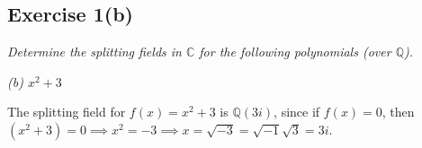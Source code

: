 \subsection*{Exercise 1(b)}
\textit{Determine the splitting fields in $\mathbb{C}$ for the following polynomials (over $\mathbb{Q}$).}

\textit{(b) $x^2 + 3$}

\vspace{5 mm}
The splitting field for $f(x) = x^2 + 3$ is $\mathbb{Q}(3i)$, since if $f(x) = 0$, then $(x^2 + 3) = 0 \implies x^2 = -3 \implies x = \sqrt{-3} = \sqrt{-1}\sqrt{3} = 3i$.